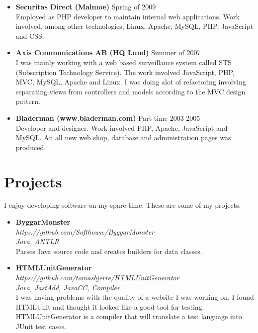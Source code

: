 \documentclass[a4paper]{article}
\begin{document}
\begin{itemize}
 \item \textbf{Securitas Direct (Malmoe)} Spring of 2009\\
 Employed as PHP developer to maintain internal web applications. Work involved, among other technologies, Linux, Apache, MySQL, PHP, JavaScript and CSS.\\
 
 \item \textbf{Axis Communications AB (HQ Lund)} Summer of 2007\\
 I was mainly working with a web based surveillance system called STS (Subscription Technology Service). The work involved JavaScript, PHP, MVC, MySQL, Apache and Linux. I was doing alot of refactoring involving separating views from controllers and models according to the MVC design pattern. \\
 
 \item \textbf{Bladerman (www.bladerman.com)} Part time 2003-2005\\
 Developer and designer. Work involved PHP, Apache, JavaScript and MySQL. An all new web shop, database and administration pages was produced.\\
\end{itemize}

\newpage

\section*{Projects}
I enjoy developing software on my spare time. These are some of my projects.
\begin{itemize}
  \item \textbf{ByggarMonster} \\
        \textit{https://github.com/Softhouse/ByggarMonster}\\
        \textit{Java, ANTLR}\\
        Parses Java source code and creates builders for data classes.
  \item \textbf{HTMLUnitGenerator} \\
        \textit{https://github.com/tomasbjerre/HTMLUnitGenerator}\\
        \textit{Java, JastAdd, JavaCC, Compiler}\\
	I was having problems with the quality of a website I was working on. I found HTMLUnit and thought it looked like a good tool for testing. HTMLUnitGenerator is a compiler that will translate a test language into JUnit test cases.
\end{itemize}
\newpage
\end{document}
